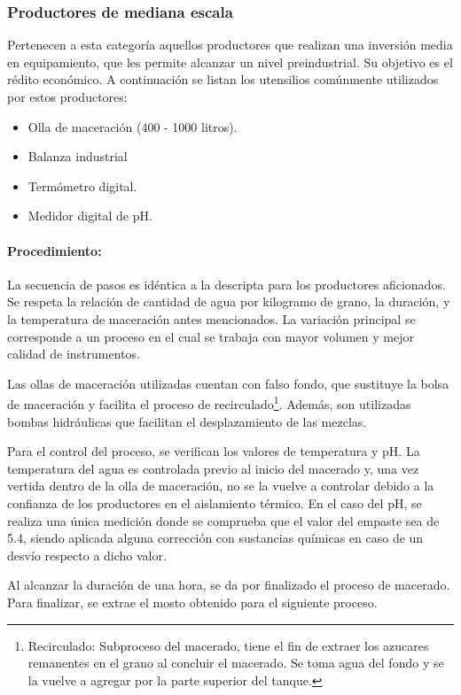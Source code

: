     
    
    \subsubsection{Productores de mediana escala}
    Pertenecen a esta categoría aquellos productores que realizan una inversión media en equipamiento, que les permite alcanzar un nivel preindustrial. Su objetivo es el rédito económico.
    A continuación se listan los utensilios comúnmente utilizados por estos productores: 
    \begin{itemize}
        \item Olla de maceración (400 - 1000 litros).
        \item Balanza industrial
        \item Termómetro digital.
        \item Medidor digital de pH.
    \end{itemize}
    \paragraph{Procedimiento: }
    La secuencia de pasos es idéntica a la descripta para los productores aficionados. Se respeta la relación de cantidad de agua por kilogramo de grano, la duración, y la temperatura de maceración antes mencionados. La variación principal se corresponde a un proceso en el cual se trabaja con mayor volumen y mejor calidad de instrumentos.
    \par
    Las ollas de maceración utilizadas cuentan con falso fondo, que sustituye la bolsa de maceración y facilita el proceso de recirculado\footnote{Recirculado: Subproceso del macerado, tiene el fin de extraer los azucares remanentes en el grano al concluir el macerado. Se toma agua del fondo y se la vuelve a agregar por la parte superior del tanque.}. Además, son utilizadas bombas hidráulicas que facilitan el desplazamiento de las mezclas.
    \par
    Para el control del proceso, se verifican los valores de temperatura y pH. La temperatura del agua es controlada previo al inicio del macerado y, una vez vertida dentro de la olla de maceración, no se la vuelve a controlar debido a la confianza de los productores en el aislamiento térmico. En el caso del pH, se realiza una única medición donde se comprueba que el valor del empaste sea de 5.4, siendo aplicada alguna corrección con sustancias químicas en caso de un desvío respecto a dicho valor.
    \par
    Al alcanzar la duración de una hora, se da por finalizado el proceso de macerado. Para finalizar, se extrae el mosto obtenido para el siguiente proceso.
    
